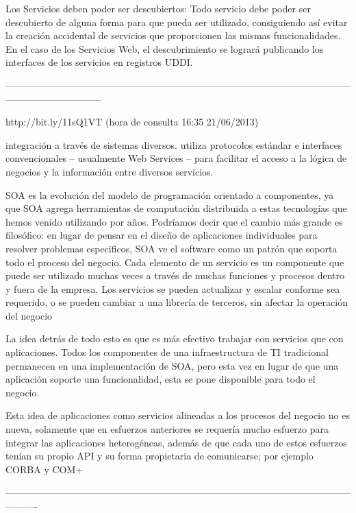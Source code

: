     Los Servicios deben poder ser descubiertos: Todo servicio debe poder ser descubierto de alguna forma para que pueda ser utilizado, 
    consiguiendo así evitar la creación accidental de servicios que proporcionen las mismas funcionalidades. En el caso de los Servicios 
    Web, el descubrimiento se logrará publicando los interfaces de los servicios en registros UDDI.
    
------------------------------------------------------------------------------------------------------------------------------------------

http://bit.ly/11sQ1VT (hora de consulta 16:35 21/06/2013)

integración a través de sistemas diversos.
utiliza protocolos estándar e interfaces convencionales – usualmente Web Services – para facilitar el acceso a la lógica de negocios 
y la información entre diversos servicios.

SOA es la evolución del modelo de programación orientado a componentes, ya que SOA agrega herramientas de computación distribuida a 
estas tecnologías que hemos venido utilizando por años. Podríamos decir que el cambio más grande es filosófico: en lugar de pensar en 
el diseño de aplicaciones individuales para resolver problemas especificos, SOA ve el software como un patrón que soporta todo el proceso 
del negocio. Cada elemento de un servicio es un componente que puede ser utilizado muchas veces a través de muchas funciones y procesos 
dentro y fuera de la empresa. Los servicios se pueden actualizar y escalar conforme sea requerido, o se pueden cambiar a una librería de 
terceros, sin afectar la operación del negocio

La idea detrás de todo esto es que es más efectivo trabajar con servicios que con aplicaciones. Todos los componentes de una
infraestructura de TI tradicional permanecen en una implementación de SOA, pero esta vez en lugar de que una aplicación soporte una
funcionalidad, esta se pone disponible para todo el negocio.

Esta idea de aplicaciones como servicios alineadas a los procesos del negocio no es nueva, solamente que en esfuerzos anteriores se 
requería mucho esfuerzo para integrar las aplicaciones heterogéneas, además de que cada uno de estos esfuerzos tenían su propio API y 
su forma propietaria de comunicarse; por ejemplo CORBA y COM+

----------------------------------------------------------------------------------------------------------------------

